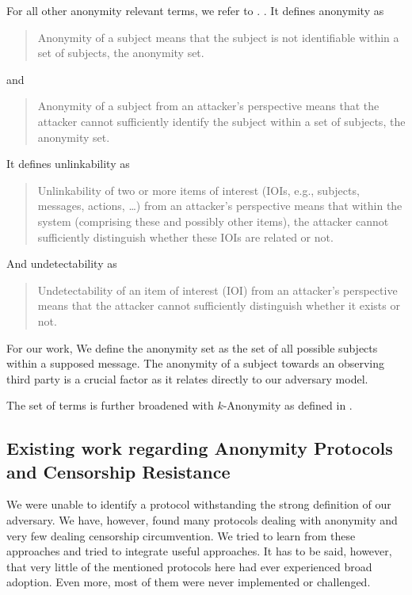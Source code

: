\documentclass[10pt,journal,compsoc]{IEEEtran}
\begin{document}
For all other anonymity relevant terms, we refer to \cite{anon_terminology}.
. It defines anonymity as 

\begin{quote}
	Anonymity of a subject means that the subject is not identifiable within a set of subjects, the anonymity set.\omitted
\end{quote}
and
\begin{quote}
	Anonymity of a subject from an attacker's perspective means that the attacker cannot sufficiently identify the subject within a set of subjects, the anonymity set.\omitted
\end{quote}

It defines unlinkability as

\begin{quote}
	Unlinkability of two or more items of interest (IOIs, e.g., subjects, messages, actions, \ldots) from an attacker’s perspective means that within the system (comprising these and possibly other items), the attacker cannot sufficiently distinguish whether these IOIs are related or not.\omitted
\end{quote}

And undetectability as
\begin{quote}
	Undetectability of an item of interest (IOI) from an attacker’s perspective means that the attacker cannot  sufficiently distinguish whether it exists or not.
\end{quote}

For our work, We define the anonymity set as the set of all possible subjects within a supposed message. The anonymity of a subject towards an observing third party is a crucial factor as it relates directly to our adversary model.

The set of terms is further broadened with $k$-Anonymity as defined in \cite{k-anonymous:ccs2003}.

\subsection{Existing work regarding Anonymity Protocols and Censorship Resistance}
We were unable to identify a protocol withstanding the strong definition of our adversary. We have, however, found many protocols dealing with anonymity and very few dealing censorship circumvention. We tried to learn from these approaches and tried to integrate useful approaches. It has to be said, however, that very little of the mentioned protocols here had ever experienced broad adoption. Even more, most of them were never implemented or challenged. 
\end{document}
